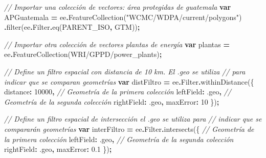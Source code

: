 \documentclass[
  12pt,
  letterpaper,
  twoside]{book}
\newenvironment{Shaded}{\begin{snugshade}}{\end{snugshade}}
\newcommand{\AttributeTok}[1]{\textcolor[rgb]{0.77,0.63,0.00}{#1}}
\newcommand{\CommentTok}[1]{\textcolor[rgb]{0.56,0.35,0.01}{\textit{#1}}}
\newcommand{\DataTypeTok}[1]{\textcolor[rgb]{0.13,0.29,0.53}{#1}}
\newcommand{\DecValTok}[1]{\textcolor[rgb]{0.00,0.00,0.81}{#1}}
\newcommand{\FloatTok}[1]{\textcolor[rgb]{0.00,0.00,0.81}{#1}}
\newcommand{\FunctionTok}[1]{\textcolor[rgb]{0.00,0.00,0.00}{#1}}
\newcommand{\KeywordTok}[1]{\textcolor[rgb]{0.13,0.29,0.53}{\textbf{#1}}}
\newcommand{\NormalTok}[1]{#1}
\newcommand{\OperatorTok}[1]{\textcolor[rgb]{0.81,0.36,0.00}{\textbf{#1}}}
\newcommand{\StringTok}[1]{\textcolor[rgb]{0.31,0.60,0.02}{#1}}
\begin{document}
\begin{Shaded}
\begin{Highlighting}[]
\CommentTok{// Importar una colección de vectores: área protegidas de guatemala}
\KeywordTok{var}\NormalTok{ APGuatemala }\OperatorTok{=}\NormalTok{ ee}\OperatorTok{.}\FunctionTok{FeatureCollection}\NormalTok{(}\StringTok{"WCMC/WDPA/current/polygons"}\NormalTok{)}
  \OperatorTok{.}\FunctionTok{filter}\NormalTok{(ee}\OperatorTok{.}\AttributeTok{Filter}\OperatorTok{.}\FunctionTok{eq}\NormalTok{(}\StringTok{\textquotesingle{}PARENT\_ISO\textquotesingle{}}\OperatorTok{,} \StringTok{\textquotesingle{}GTM\textquotesingle{}}\NormalTok{))}\OperatorTok{;}

\CommentTok{// Importar otra colección de vectores plantas de  energía}
\KeywordTok{var}\NormalTok{ plantas }\OperatorTok{=}\NormalTok{ ee}\OperatorTok{.}\FunctionTok{FeatureCollection}\NormalTok{(}\StringTok{\textquotesingle{}WRI/GPPD/power\_plants\textquotesingle{}}\NormalTok{)}\OperatorTok{;}

\CommentTok{// Define un filtro espacial con distancia de 10 km. El .geo se utiliza }
\CommentTok{// para indicar que se comparan geometrías}
\KeywordTok{var}\NormalTok{ distFiltro }\OperatorTok{=}\NormalTok{ ee}\OperatorTok{.}\AttributeTok{Filter}\OperatorTok{.}\FunctionTok{withinDistance}\NormalTok{(\{}
  \DataTypeTok{distance}\OperatorTok{:} \DecValTok{10000}\OperatorTok{,}
  \CommentTok{// Geometría de la primera colección}
  \DataTypeTok{leftField}\OperatorTok{:} \StringTok{\textquotesingle{}.geo\textquotesingle{}}\OperatorTok{,} 
  \CommentTok{// Geometría de la segunda colección}
  \DataTypeTok{rightField}\OperatorTok{:} \StringTok{\textquotesingle{}.geo\textquotesingle{}}\OperatorTok{,} 
  \DataTypeTok{maxError}\OperatorTok{:} \DecValTok{10}
\NormalTok{\})}\OperatorTok{;}

\CommentTok{// Define un filtro espacial de intersección el .geo se utiliza para }
\CommentTok{// indicar que se compararán geometrías}
\KeywordTok{var}\NormalTok{ interFiltro }\OperatorTok{=}\NormalTok{ ee}\OperatorTok{.}\AttributeTok{Filter}\OperatorTok{.}\FunctionTok{intersects}\NormalTok{(\{}
  \CommentTok{// Geometría de la primera colección}
  \DataTypeTok{leftField}\OperatorTok{:} \StringTok{\textquotesingle{}.geo\textquotesingle{}}\OperatorTok{,} 
  \CommentTok{// Geometría de la segunda colección}
  \DataTypeTok{rightField}\OperatorTok{:} \StringTok{\textquotesingle{}.geo\textquotesingle{}}\OperatorTok{,} 
  \DataTypeTok{maxError}\OperatorTok{:} \FloatTok{0.1}
\NormalTok{\})}\OperatorTok{;}


\end{Highlighting}
\end{Shaded}
\end{document}
